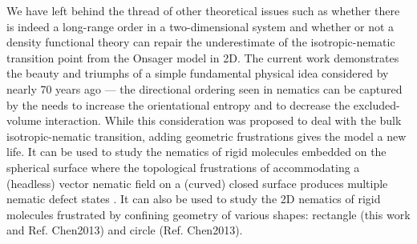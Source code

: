 \documentclass[prl,twocolumn,preprintnumbers,reprint]{revtex4}
\newcommand*{\citen}{}%
\DeclareRobustCommand*{\citen}[1]{%
  \begingroup
    \romannumeral-`\x %
    \setcitestyle{numbers}%
    \cite{#1}%
  \endgroup
}
\begin{document}
We have left behind the thread of other theoretical issues such as whether there is indeed a long-range order
in a two-dimensional system \cite{Frenkel1985,Dijkstra2003} and whether or not
a density functional theory \cite{delasHeras2009} can repair the underestimate of the isotropic-nematic transition point from the Onsager model in 2D. The current work  demonstrates the beauty and triumphs of a simple fundamental physical idea considered by \citeauthor{Onsager1949} nearly 70 years ago --- the directional ordering seen in nematics can be captured by the needs to increase the orientational entropy and to decrease the excluded-volume interaction. While this consideration was proposed to deal with the bulk isotropic-nematic transition, adding geometric frustrations gives the model a new life. It can be used to study the nematics of rigid molecules embedded on the spherical surface
where the topological frustrations of accommodating a (headless) vector nematic field on a (curved) closed surface
produces multiple nematic defect states \cite{Wuyang2012prl,Wuyang2012pre,Liang2014}. It can also be used to study the 2D nematics of rigid molecules frustrated by confining geometry of various shapes: rectangle (this work and Ref. \citen{Chen2013}) and circle (Ref. \citen{Chen2013}).





%


%


\end{document}
